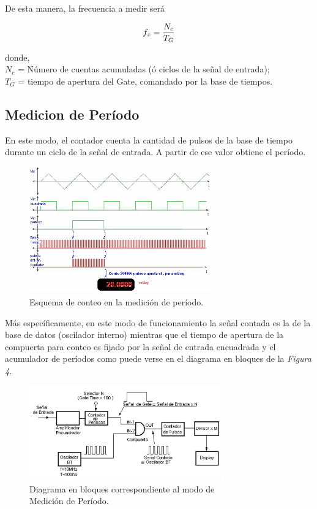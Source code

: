 \documentclass{article}
\begin{document}
	De esta manera, la frecuencia a medir será
\medskip

\begin{equation}
	f_x = {N_c \over T_G}
\end{equation}


\noindent donde, \\
$N_c$ = Número de cuentas acumuladas (ó ciclos de la señal de entrada);\\
$T_G$ = tiempo de apertura del Gate, comandado por la base de tiempos.
\bigskip\bigskip



\subsection {Medicion de Período}
\medskip

	En este modo, el contador cuenta la cantidad de pulsos de la base de tiempo durante un ciclo de la señal de entrada. A partir de ese valor obtiene el período. 
\bigskip\bigskip


\begin{figure}[h]
	\centering
	\includegraphics[width=0.70\textwidth]{images/03-ondasPeriodoContador.jpg}
	\medskip
	\caption{Esquema de conteo en la medición de período.}
\end{figure}
\bigskip\bigskip


	Más específicamente, en este modo de funcionamiento la señal contada es la de la base de datos (oscilador interno) mientras que el tiempo de apertura de la compuerta para conteo es fijado por la señal de entrada encuadrada y el acumulador de períodos como puede verse en el diagrama en bloques de la \textit{Figura 4}.
\bigskip\bigskip


\begin{figure}[h]
	\centering
	\includegraphics[width=0.75\textwidth]{images/04-diagrama-en-bloques-modo-medicion-periodo.jpg}
	\medskip
	\caption{Diagrama en bloques correspondiente al modo de\\ Medición de Período.}
\end{figure}
\bigskip\bigskip
\end{document}
